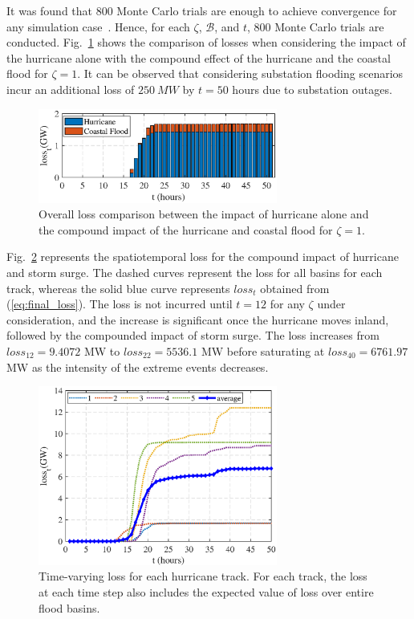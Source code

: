 It was found that 800 Monte Carlo trials are enough to achieve convergence for any simulation case~\cite{9917119}. Hence, for each $\zeta$, $\mathcal{B}$, and $t$, 800 Monte Carlo trials are conducted. Fig.~\ref{fig:hurricane_flood_compound} shows the comparison of losses when considering the impact of the hurricane alone with the compound effect of the hurricane and the coastal flood for $\zeta=1$. It can be observed that considering substation flooding scenarios incur an additional loss of $250~MW$ by $t=50$ hours due to substation outages.   

\begin{figure}
    \centering
    \includegraphics[width=0.7\textwidth]{figures/hurricanevsflood.eps}
    \caption{Overall loss comparison between the impact of hurricane alone and the compound impact of the hurricane and coastal flood for $\zeta = 1$.}
    \label{fig:hurricane_flood_compound}
\end{figure}

Fig.~\ref{fig:final_losses} represents the spatiotemporal loss for the compound impact of hurricane and storm surge. The dashed curves represent the loss for all basins for each track, whereas the solid blue curve represents $loss_t$ obtained from (\ref{eq:final_loss}). The loss is not incurred until $t=12$ for any $\zeta$ under consideration, and the increase is significant once the hurricane moves inland, followed by the compounded impact of storm surge. The loss increases from $loss_{12} = 9.4072$ MW to $loss_{22} = 5536.1$ MW before saturating at $loss_{40} = 6761.97$ MW as the intensity of the extreme events decreases.  

\begin{figure}[!h!]
    \centering
    \includegraphics[width=0.7\textwidth]{figures/all_basin_losses.eps}
    \caption{Time-varying loss for each hurricane track. For each track, the loss at each time step also includes the expected value of loss over entire flood basins.}
    \label{fig:final_losses}
\end{figure}
